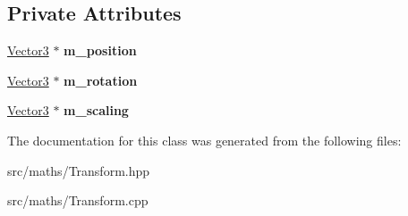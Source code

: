 \subsection*{Private Attributes}
\begin{DoxyCompactItemize}
\item 
\mbox{\label{class_flounder_1_1_transform_a8bd0d020b3f5d70aff36a0b3055442f1}} 
\hyperlink{class_flounder_1_1_vector3}{Vector3} $\ast$ {\bfseries m\+\_\+position}
\item 
\mbox{\label{class_flounder_1_1_transform_aa97e660d671fa89b874ff152bb9569d3}} 
\hyperlink{class_flounder_1_1_vector3}{Vector3} $\ast$ {\bfseries m\+\_\+rotation}
\item 
\mbox{\label{class_flounder_1_1_transform_a437398952b63dfcb98b2d64f684f8279}} 
\hyperlink{class_flounder_1_1_vector3}{Vector3} $\ast$ {\bfseries m\+\_\+scaling}
\end{DoxyCompactItemize}


The documentation for this class was generated from the following files\+:\begin{DoxyCompactItemize}
\item 
src/maths/Transform.\+hpp\item 
src/maths/Transform.\+cpp\end{DoxyCompactItemize}
